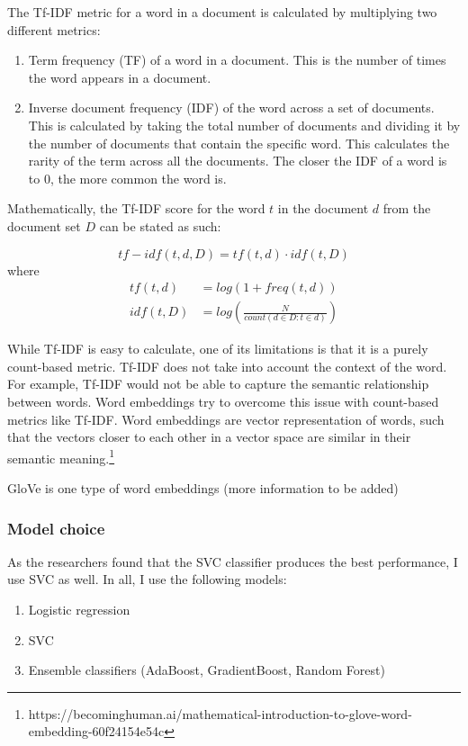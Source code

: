 The Tf-IDF metric for a word in a document is calculated by multiplying two different metrics:

\begin{enumerate}
	\item Term frequency (TF) of a word in a document. This is the number of times the word appears in a document.
	\item Inverse document frequency (IDF) of the word across a set of documents. This is calculated by taking the total number of documents and dividing it by the number of documents that contain the specific word. This calculates the rarity of the term across all the documents. The closer the IDF of a word is to 0, the more common the word is.
\end{enumerate}

Mathematically, the Tf-IDF score for the word $t$ in the document $d$ from the document set $D$ can be stated as such:

\[tf-idf(t, d, D) = tf(t, d) \cdot idf(t, D)\]
where 
\begin{align*}
	tf(t, d) &= log(1 + freq(t, d )) \\
	idf(t, D) &= log\left(\frac{N}{count(d \in D : t \in d)}\right)
\end{align*}

While Tf-IDF is easy to calculate, one of its limitations is that it is a purely count-based metric. Tf-IDF does not take into account the context of the word. For example, Tf-IDF would not be able to capture the semantic relationship between words. Word embeddings try to overcome this issue with count-based metrics like Tf-IDF. Word embeddings are vector representation of words, such that the vectors closer to each other in a vector space are similar in their semantic meaning.\footnote{https://becominghuman.ai/mathematical-introduction-to-glove-word-embedding-60f24154e54c}

GloVe is one type of word embeddings (more information to be added)


\subsubsection{Model choice}
As the researchers found that the SVC classifier produces the best performance, I use SVC as well. In all, I use the following models:
\begin{enumerate}
	\item Logistic regression
	\item SVC
	\item Ensemble classifiers (AdaBoost, GradientBoost, Random Forest)
\end{enumerate}

